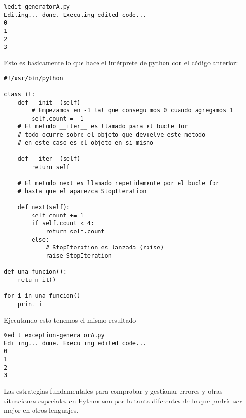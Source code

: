 \documentclass[twoside,10.5pt]{article}%
\begin{document}
\begin{verbatim}
%edit generatorA.py
Editing... done. Executing edited code...
0
1
2
3
\end{verbatim}

\vspace{0.3cm}

Esto es b\'asicamente lo que hace el int\'erprete de python con el c\'odigo anterior:

\vspace{0.3cm}

\begin{verbatim}
#!/usr/bin/python

class it:
    def __init__(self):
        # Empezamos en -1 tal que conseguimos 0 cuando agregamos 1
        self.count = -1
    # El metodo __iter__ es llamado para el bucle for
    # todo ocurre sobre el objeto que devuelve este metodo
    # en este caso es el objeto en si mismo
    
    def __iter__(self):
        return self
    
    # El metodo next es llamado repetidamente por el bucle for
    # hasta que el aparezca StopIteration
    
    def next(self):
        self.count += 1
        if self.count < 4:
            return self.count
        else:
            # StopIteration es lanzada (raise)
            raise StopIteration
            
def una_funcion():
    return it()

for i in una_funcion():
    print i
\end{verbatim}

\vspace{0.3cm}


Ejecutando esto tenemos el mismo resultado


\begin{verbatim}
%edit exception-generatorA.py
Editing... done. Executing edited code...
0
1
2
3

\end{verbatim}

Las estrategias fundamentales para comprobar y gestionar errores y otras situaciones especiales en Python son por lo tanto diferentes de lo que podr\'ia ser mejor en otros lenguajes. 
\end{document}
